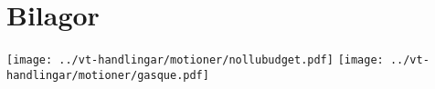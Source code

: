 \documentclass[10pt]{article}
\begin{document}
\section*{Bilagor}
\thispagestyle{empty}
%
%
\texttt{[image: ../vt-handlingar/motioner/nollubudget.pdf]}
\newpage
\thispagestyle{empty}
\texttt{[image: ../vt-handlingar/motioner/gasque.pdf]}
%
\end{document}
